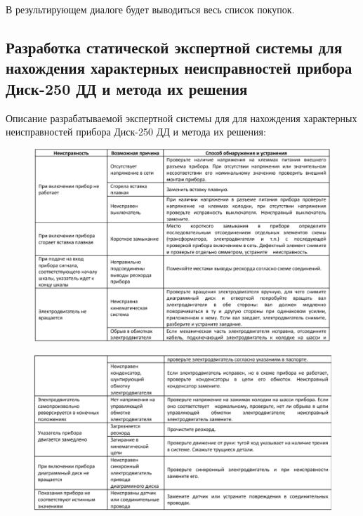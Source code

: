 \documentclass[14pt,a4paper,report]{report}
\begin{document}
В результирующем диалоге будет выводиться весь список покупок.


\subsection{Разработка статической экспертной системы для нахождения характерных неисправностей прибора Диск-250 ДД и метода их решения}

Описание разрабатываемой экспертной системы для для нахождения характерных неисправностей прибора Диск-250 ДД и метода их решения:

\begin{figure}[h!]
	\centering
	\includegraphics[scale = 0.65]{images/7_x1.png}
\end{figure}

\begin{figure}[h!]
	\centering
	\includegraphics[scale = 0.65]{images/7_x2.png}
\end{figure}

\clearpage
\end{document}
